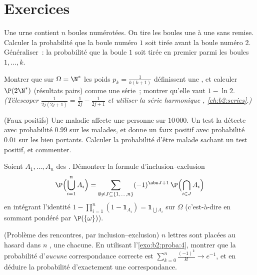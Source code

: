 \section{Exercices}

\begin{exercise}[$\star$]\label{exo:b2:proba:1}
Une urne contient $n$ boules numérotées. On tire les boules une à une
sans remise. Calculer la probabilité que la boule numéro $1$
soit tirée avant la boule numéro $2$. Généraliser~: la probabilité que
la boule $1$ soit tirée en premier parmi les boules $1, \dots, k$.
\end{exercise}

\begin{exercise}[$\star$]\label{exo:b2:proba:2}
Montrer que sur $\Omega = \N^*$ les poids $p_k = \frac{1}{k(k+1)}$
définissent une , et calculer $\P(2\N^*)$ (résultats
pairs) comme une série~; montrer qu'elle vaut $1 - \ln 2$.
\emph{(Télescoper $\frac{1}{2j(2j+1)} = \frac{1}{2j} -
\frac{1}{2j+1}$ et utiliser la série harmonique ,
\cref{ch:b2:series}.)}
\end{exercise}

\begin{exercise}[$\star$]\label{exo:b2:proba:3}
(Faux positifs) Une maladie affecte une personne sur $10\,000$. Un
test la détecte avec probabilité $0.99$ sur les malades, et donne un
faux positif avec probabilité $0.01$ sur les bien portants. Calculer
la probabilité d'être malade sachant un test positif, et commenter.
\end{exercise}

\begin{exercise}[$\star\star$]\label{exo:b2:proba:4}
Soient $A_1, \dots, A_n$ des . Démontrer la formule
d'inclusion--exclusion
\[
\P\Bigl(\bigcup_{i=1}^n A_i\Bigr)
= \sum_{\emptyset \neq J \subseteq \{1,\dots,n\}}
(-1)^{\abs J + 1}\,\P\Bigl(\bigcap_{i \in J}A_i\Bigr)
\]
en intégrant l'identité $1 - \prod_{i=1}^n(1 -
\mathbf{1}_{A_i}) = \mathbf{1}_{\bigcup A_i}$ sur $\Omega$
(c'est-à-dire en sommant pondéré par $\P(\{\omega\})$).
\end{exercise}

\begin{exercise}[$\star\star$]\label{exo:b2:proba:5}
(Problème des rencontres, par inclusion--exclusion) $n$ lettres sont placées
 au hasard dans $n$ , une chacune. En utilisant
l'\cref{exo:b2:proba:4}, montrer que la probabilité d'\emph{aucune}
correspondance correcte est $\sum_{k=0}^n \frac{(-1)^k}{k!} \to e^{-1}$, et
en déduire la probabilité d'exactement une correspondance.
\end{exercise}

